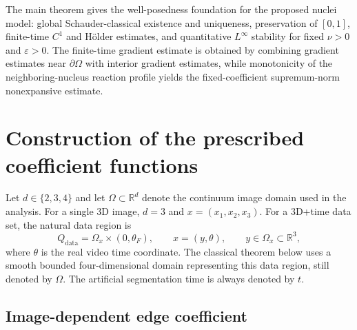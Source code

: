 \documentclass[11pt]{article}
\theoremstyle{remark}
\newcommand{\R}{\mathbb{R}}
\newcommand{\eps}{\varepsilon}
\newcommand{\nupar}{\nu}
\begin{document}

The main theorem gives the well-posedness foundation for the proposed nuclei model: global Schauder-classical existence and uniqueness, preservation of $[0,1]$, finite-time $C^1$ and H\"older estimates, and quantitative $L^\infty$ stability for fixed $\nupar>0$ and $\eps>0$. The finite-time gradient estimate is obtained by combining gradient estimates near $\partial\Omega$ with interior gradient estimates, while monotonicity of the neighboring-nucleus reaction profile yields the fixed-coefficient supremum-norm nonexpansive estimate.

\section{Construction of the prescribed coefficient functions}
\label{sec:construction}

Let $d\in\{2,3,4\}$ and let $\Omega\subset\R^d$ denote the continuum image domain used in the analysis.  For a single 3D image, $d=3$ and $x=(x_1,x_2,x_3)$.  For a 3D+time data set, the natural data region is
\[
        Q_{\mathrm{data}}=\Omega_x\times(0,\theta_F),\qquad x=(y,\theta),\qquad y\in\Omega_x\subset\R^3,
\]
where $\theta$ is the real video time coordinate.  The classical theorem below uses a smooth bounded four-dimensional domain representing this data region, still denoted by $\Omega$.  The artificial segmentation time is always denoted by $t$.

\subsection{Image-dependent edge coefficient}
\end{document}

